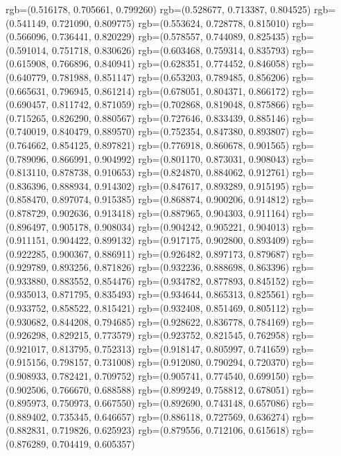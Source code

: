 {{{					rgb=(0.516178, 0.705661, 0.799260)
					rgb=(0.528677, 0.713387, 0.804525)
					rgb=(0.541149, 0.721090, 0.809775)
					rgb=(0.553624, 0.728778, 0.815010)
					rgb=(0.566096, 0.736441, 0.820229)
					rgb=(0.578557, 0.744089, 0.825435)
					rgb=(0.591014, 0.751718, 0.830626)
					rgb=(0.603468, 0.759314, 0.835793)
					rgb=(0.615908, 0.766896, 0.840941)
					rgb=(0.628351, 0.774452, 0.846058)
					rgb=(0.640779, 0.781988, 0.851147)
					rgb=(0.653203, 0.789485, 0.856206)
					rgb=(0.665631, 0.796945, 0.861214)
					rgb=(0.678051, 0.804371, 0.866172)
					rgb=(0.690457, 0.811742, 0.871059)
					rgb=(0.702868, 0.819048, 0.875866)
					rgb=(0.715265, 0.826290, 0.880567)
					rgb=(0.727646, 0.833439, 0.885146)
					rgb=(0.740019, 0.840479, 0.889570)
					rgb=(0.752354, 0.847380, 0.893807)
					rgb=(0.764662, 0.854125, 0.897821)
					rgb=(0.776918, 0.860678, 0.901565)
					rgb=(0.789096, 0.866991, 0.904992)
					rgb=(0.801170, 0.873031, 0.908043)
					rgb=(0.813110, 0.878738, 0.910653)
					rgb=(0.824870, 0.884062, 0.912761)
					rgb=(0.836396, 0.888934, 0.914302)
					rgb=(0.847617, 0.893289, 0.915195)
					rgb=(0.858470, 0.897074, 0.915385)
					rgb=(0.868874, 0.900206, 0.914812)
					rgb=(0.878729, 0.902636, 0.913418)
					rgb=(0.887965, 0.904303, 0.911164)
					rgb=(0.896497, 0.905178, 0.908034)
					rgb=(0.904242, 0.905221, 0.904013)
					rgb=(0.911151, 0.904422, 0.899132)
					rgb=(0.917175, 0.902800, 0.893409)
					rgb=(0.922285, 0.900367, 0.886911)
					rgb=(0.926482, 0.897173, 0.879687)
					rgb=(0.929789, 0.893256, 0.871826)
					rgb=(0.932236, 0.888698, 0.863396)
					rgb=(0.933880, 0.883552, 0.854476)
					rgb=(0.934782, 0.877893, 0.845152)
					rgb=(0.935013, 0.871795, 0.835493)
					rgb=(0.934644, 0.865313, 0.825561)
					rgb=(0.933752, 0.858522, 0.815421)
					rgb=(0.932408, 0.851469, 0.805112)
					rgb=(0.930682, 0.844208, 0.794685)
					rgb=(0.928622, 0.836778, 0.784169)
					rgb=(0.926298, 0.829215, 0.773579)
					rgb=(0.923752, 0.821545, 0.762958)
					rgb=(0.921017, 0.813795, 0.752313)
					rgb=(0.918147, 0.805997, 0.741659)
					rgb=(0.915156, 0.798157, 0.731008)
					rgb=(0.912080, 0.790294, 0.720370)
					rgb=(0.908933, 0.782421, 0.709752)
					rgb=(0.905741, 0.774540, 0.699150)
					rgb=(0.902506, 0.766670, 0.688588)
					rgb=(0.899249, 0.758812, 0.678051)
					rgb=(0.895973, 0.750973, 0.667550)
					rgb=(0.892690, 0.743148, 0.657086)
					rgb=(0.889402, 0.735345, 0.646657)
					rgb=(0.886118, 0.727569, 0.636274)
					rgb=(0.882831, 0.719826, 0.625923)
					rgb=(0.879556, 0.712106, 0.615618)
					rgb=(0.876289, 0.704419, 0.605357)
}}}
